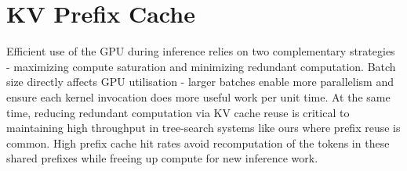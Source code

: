 \documentclass[11pt,twoside]{report}
\begin{document}
\section{KV Prefix Cache}

Efficient use of the GPU during inference relies on two complementary strategies - maximizing compute saturation and minimizing redundant computation. 
Batch size directly affects GPU utilisation - larger batches enable more parallelism and ensure each kernel invocation does more useful work per unit time. 
At the same time, reducing redundant computation via KV cache reuse is critical to maintaining high throughput in tree-search systems like ours where prefix reuse is common.
High prefix cache hit rates avoid recomputation of the tokens in these shared prefixes while freeing up compute for new inference work.
\end{document}
